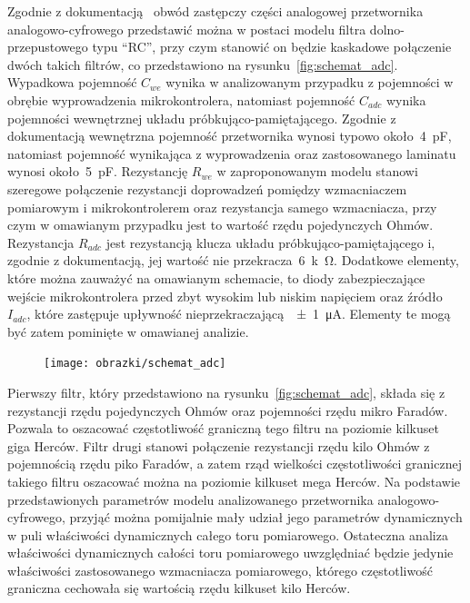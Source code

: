 Zgodnie z dokumentacją~\cite{stm_f411} obwód zastępczy części analogowej przetwornika analogowo-cyfrowego przedstawić można w postaci modelu filtra dolno-przepustowego typu \enquote{RC}, przy czym stanowić on będzie kaskadowe połączenie dwóch takich filtrów, co przedstawiono na rysunku~\ref{fig:schemat_adc}. Wypadkowa pojemność $C_{we}$ wynika w analizowanym przypadku z pojemności w obrębie wyprowadzenia mikrokontrolera, natomiast pojemność $C_{adc}$ wynika pojemności wewnętrznej układu próbkująco-pamiętającego. Zgodnie z dokumentacją wewnętrzna pojemność przetwornika wynosi typowo około~\qty{4}{pF}, natomiast pojemność wynikająca z wyprowadzenia oraz zastosowanego laminatu wynosi około~\qty{5}{pF}. Rezystancję $R_{we}$ w zaproponowanym modelu stanowi szeregowe połączenie rezystancji doprowadzeń pomiędzy wzmacniaczem pomiarowym i mikrokontrolerem oraz rezystancja samego wzmacniacza, przy czym w omawianym przypadku jest to wartość rzędu pojedynczych Ohmów. Rezystancja $R_{adc}$ jest rezystancją klucza układu próbkująco-pamiętającego i, zgodnie z dokumentacją, jej wartość nie przekracza~\qty{6}{k\ohm}. Dodatkowe elementy, które można zauważyć na omawianym schemacie, to diody zabezpieczające wejście mikrokontrolera przed zbyt wysokim lub niskim napięciem oraz źródło $I_{adc}$, które zastępuje upływność nieprzekraczającą~\qty{\pm 1}{\micro A}. Elementy te mogą być zatem pominięte w omawianej analizie.

\begin{figure}[htb!]
\begin{center}
\texttt{[image: obrazki/schemat\_adc]}
\end{center}
\end{figure}

Pierwszy filtr, który przedstawiono na rysunku~\ref{fig:schemat_adc}, składa się z rezystancji rzędu pojedynczych Ohmów oraz pojemności rzędu mikro Faradów. Pozwala to oszacować częstotliwość graniczną tego filtru na poziomie kilkuset giga Herców. Filtr drugi stanowi połączenie rezystancji rzędu kilo Ohmów z pojemnością rzędu piko Faradów, a zatem rząd wielkości częstotliwości granicznej takiego filtru oszacować można na poziomie kilkuset mega Herców. Na podstawie przedstawionych parametrów modelu analizowanego przetwornika analogowo-cyfrowego, przyjąć można pomijalnie mały udział jego parametrów dynamicznych w puli właściwości dynamicznych całego toru pomiarowego. Ostateczna analiza właściwości dynamicznych całości toru pomiarowego uwzględniać będzie jedynie właściwości zastosowanego wzmacniacza pomiarowego, którego częstotliwość graniczna cechowała się wartością rzędu kilkuset kilo Herców.

